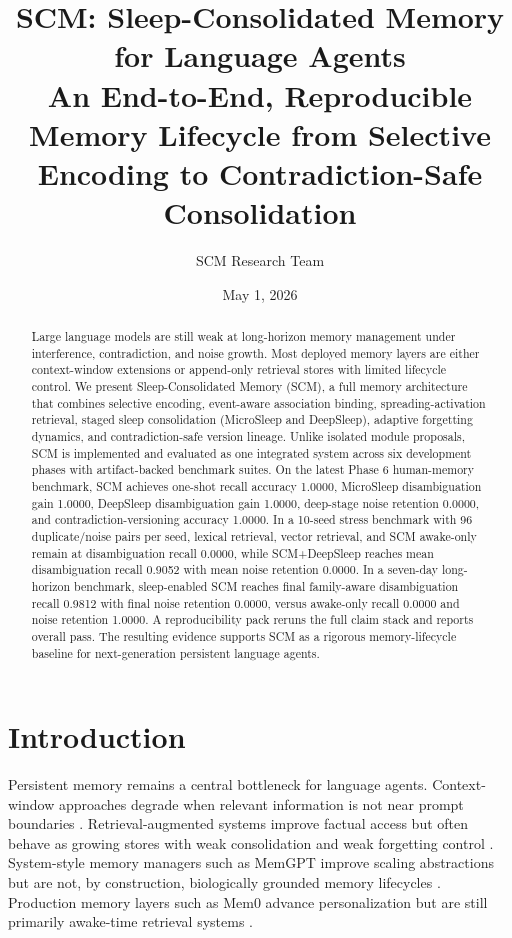 \documentclass[11pt,a4paper]{article}
\title{SCM: Sleep-Consolidated Memory for Language Agents\\
\large An End-to-End, Reproducible Memory Lifecycle from Selective Encoding to Contradiction-Safe Consolidation}
\author{SCM Research Team}
\date{May 1, 2026}
\begin{document}
\maketitle

\begin{abstract}
Large language models are still weak at long-horizon memory management under interference, contradiction, and noise growth. Most deployed memory layers are either context-window extensions or append-only retrieval stores with limited lifecycle control. We present Sleep-Consolidated Memory (SCM), a full memory architecture that combines selective encoding, event-aware association binding, spreading-activation retrieval, staged sleep consolidation (MicroSleep and DeepSleep), adaptive forgetting dynamics, and contradiction-safe version lineage. Unlike isolated module proposals, SCM is implemented and evaluated as one integrated system across six development phases with artifact-backed benchmark suites. On the latest Phase 6 human-memory benchmark, SCM achieves one-shot recall accuracy 1.0000, MicroSleep disambiguation gain 1.0000, DeepSleep disambiguation gain 1.0000, deep-stage noise retention 0.0000, and contradiction-versioning accuracy 1.0000. In a 10-seed stress benchmark with 96 duplicate/noise pairs per seed, lexical retrieval, vector retrieval, and SCM awake-only remain at disambiguation recall 0.0000, while SCM+DeepSleep reaches mean disambiguation recall 0.9052 with mean noise retention 0.0000. In a seven-day long-horizon benchmark, sleep-enabled SCM reaches final family-aware disambiguation recall 0.9812 with final noise retention 0.0000, versus awake-only recall 0.0000 and noise retention 1.0000. A reproducibility pack reruns the full claim stack and reports overall pass. The resulting evidence supports SCM as a rigorous memory-lifecycle baseline for next-generation persistent language agents.
\end{abstract}

\section{Introduction}
Persistent memory remains a central bottleneck for language agents. Context-window approaches degrade when relevant information is not near prompt boundaries \cite{liu2023lost}. Retrieval-augmented systems improve factual access but often behave as growing stores with weak consolidation and weak forgetting control \cite{lewis2020retrieval}. System-style memory managers such as MemGPT improve scaling abstractions but are not, by construction, biologically grounded memory lifecycles \cite{packer2023memgpt}. Production memory layers such as Mem0 advance personalization but are still primarily awake-time retrieval systems \cite{chhikara2025mem0}.
\end{document}

